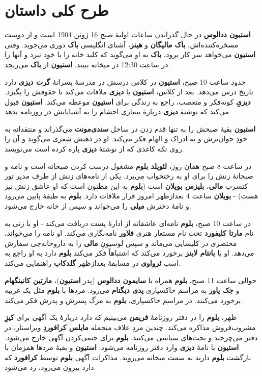 \documentclass[12pt]{book}
\newcommand{\noun}[1]{{\textbf{#1}}}
\begin{document}
    \part{طرح کلی داستان}
    \noun{استیون ددالوس} در حال گذراندن ساعات اولیهٔ صبح 16 ژوئن 1904 است و از دوست مسخره‌کننده‌اش، \noun{باک مالیگان} و \noun{هینز}، آشنای انگلیسی \noun{باک} دوری می‌جوید. وقتی \noun{استیون} می‌خواهد سر کار برود، \noun{باک} به او می‌گوید که کلید خانه را با خود نبرد و آنها را در ساعت 12:30 در میخانه ببیند. \noun{استیون} از \noun{باک} می‌رنجد.

    حدود ساعت 10 صبح، \noun{استیون} در کلاس درسش در مدرسهٔ پسرانهٔ \noun{گرت دیزی} دارد تاریخ درس می‌دهد. بعد از کلاس، \noun{استیون} با \noun{دیزی} ملاقات می‌کند تا حقوقش را بگیرد. \noun{دیزیِ} کوته‌فکر و متعصب، راجع به زندگی برای \noun{استیون} موعظه می‌کند. \noun{استیون} قبول می‌کند که نوشتهٔ \noun{دیزی} دربارهٔ بیماری احشام را به آشنایانش در روزنامه بدهد.

    \noun{استیون} بقیهٔ صبحش را به تنها قدم زدن در ساحل \noun{سندی‌مونت} می‌گذراند و منتقدانه به خودِ جوان‌ترش و به ادراک و الهام فکر می‌کند. او در ذهنش شعری می‌گوید و آن را روی تکه کاغذی که از نوشتهٔ \noun{دیزی} پاره کرده است می‌نویسد.

    در ساعت 8 صبح همان روز، \noun{لئوپلد بلوم} مشغول درست کردن صبحانه است و نامه و صبحانهٔ زنش را برای او به رختخواب می‌برد. یکی از نامه‌های زنش از طرف مدیر تور کنسرتِ \noun{مالی}، \noun{بلیزس بویلان} است (\noun{بلوم} به این مظنون است که او عاشق زنش نیز هست) - \noun{بویلان} ساعت 4 بعدازظهر امروز قرار ملاقات دارد. \noun{بلوم} به طبقهٔ پایین می‌رود و نامهٔ دخترش \noun{میلی} را می‌خواند و سپس از خانه خارج می‌شود.

    در ساعت 10 صبح، \noun{بلوم} نامه‌ای عاشقانه از ادارهٔ پست دریافت می‌کند - او با زنی به نام \noun{مارتا کلیفورد} تحت نام مستعار هنری \noun{فلاور} نامه‌نگاری می‌کند. او نامه را می‌خواند، مختصری در کلیسایی می‌ماند و سپس لوسیونِ \noun{مالی} را به داروخانه‌چی سفارش می‌دهد. او با \noun{بانتام لاینز} برخورد می‌کند که اشتباهاً فکر می‌کند \noun{بلوم} دارد به او راجع به اسب \noun{ثرواوی} در مسابقهٔ بعدازظهر \noun{گلدکاپ} راهنمایی می‌کند.

    حوالی ساعت 11 صبح، \noun{بلوم} همراه با \noun{سایمون ددالوس} (پدر \noun{استیون})، \noun{مارتین کانینگهام} و \noun{جک پاور} به مراسم خاکسپاری \noun{پدی دیگنام} می‌رود. مردها با \noun{بلوم} مثل یک غریبه برخورد می‌کنند. در مراسم خاکسپاری، \noun{بلوم} به مرگ پسرش و پدرش فکر می‌کند.

    ظهر، \noun{بلوم} را در دفتر روزنامهٔ \noun{فریمن} می‌بینیم که دارد دربارهٔ یک آگهی برای \noun{کیزِ} مشروب‌فروش مذاکره می‌کند. چندین مردِ علاف منجمله \noun{مایلس کرافوردِ} ویراستار، در دفتر می‌چرخند و بحث‌های سیاسی می‌کنند. \noun{بلوم} برای حتمی‌کردن آگهی خارج می‌شود. \noun{استیون} با نامهٔ \noun{دیزی} وارد دفتر روزنامه می‌شود. \noun{استیون} و بقیهٔ مردها همزمان با بازگشت \noun{بلوم} دارند به سمت میخانه می‌روند. مذاکرات آگهی \noun{بلوم} توسط \noun{کرافورد} که دارد بیرون می‌رود، رد می‌شود.
\end{document}
